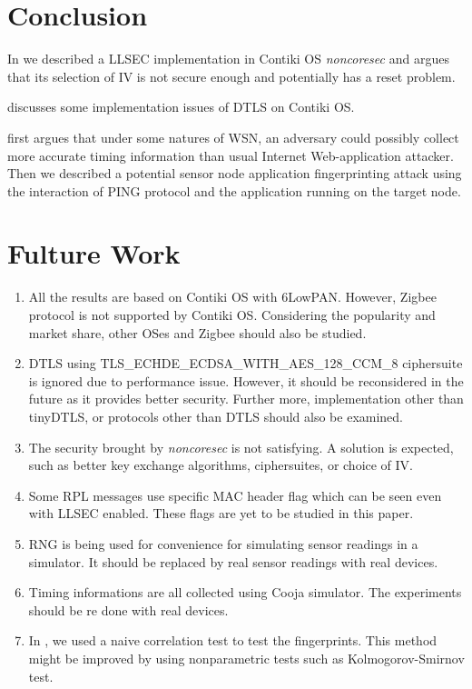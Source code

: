 \chapter{Conclusion}

In  we described a LLSEC implementation in Contiki OS \textit{noncoresec} and argues that its selection of IV is not secure enough and potentially has a reset problem.

 discusses some implementation issues of DTLS on Contiki OS.

 first argues that under some natures of WSN, an adversary could possibly collect more accurate timing information than usual Internet Web-application attacker. Then we described a potential sensor node application fingerprinting attack using the interaction of PING protocol and the application running on the target node.

\chapter{Fulture Work}
\begin{enumerate}
\item All the results are based on Contiki OS with 6LowPAN. However, Zigbee\cite{Zigbee} protocol is not supported by Contiki OS. Considering the popularity and market share, other OSes and Zigbee should also be studied.

\item DTLS using TLS\_ECHDE\_ECDSA\_WITH\_AES\_128\_CCM\_8 ciphersuite is ignored due to performance issue. However, it should be reconsidered in the future as it provides better security. Further more, implementation other than tinyDTLS, or protocols other than DTLS should also be examined.

\item The security brought by \textit{noncoresec} is not satisfying. A solution is expected, such as better key exchange algorithms, ciphersuites, or choice of IV.

\item Some RPL messages use specific MAC header flag which can be seen even with LLSEC enabled. These flags are yet to be studied in this paper.

\item RNG is being used for convenience for simulating sensor readings in a simulator. It should be replaced by real sensor readings with real devices.

\item Timing informations are all collected using Cooja simulator. The experiments should be re done with real devices.

\item In , we used a naive correlation test to test the fingerprints. This method might be improved by using nonparametric tests such as Kolmogorov-Smirnov test.
\end{enumerate}